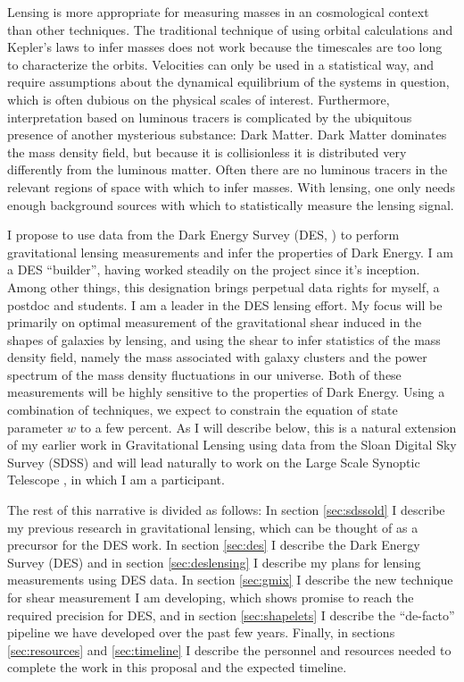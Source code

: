 \documentclass[12pt]{article}
\begin{document}
Lensing is more appropriate for measuring masses in an cosmological context
than other techniques.  The traditional technique of using orbital calculations
and Kepler's laws to infer masses does not work because the timescales are too
long to characterize the orbits. Velocities can only be used in a statistical
way, and require assumptions about the dynamical equilibrium of the systems in
question, which is often dubious on the physical scales of interest.
Furthermore, interpretation based on luminous tracers is complicated by the
ubiquitous presence of another mysterious substance: Dark Matter.  Dark Matter
dominates the mass density field, but because it is collisionless it is
distributed very differently from the luminous matter.  Often there are no
luminous tracers in the relevant regions of space with which to infer masses.
With lensing, one only needs enough background sources with which to
statistically measure the lensing signal.

I propose to use data from the Dark Energy Survey (DES, \cite{DESWhitePaper})
to perform gravitational lensing measurements and infer the properties of Dark
Energy.  I am a DES ``builder'', having worked steadily on the project since
it's inception.  Among other things, this designation brings perpetual data
rights for myself, a postdoc and students.  I am a leader in the DES lensing
effort.  My focus will be primarily on optimal measurement of the gravitational
shear induced in the shapes of galaxies by lensing, and using the shear to
infer statistics of the mass density field, namely the mass associated with
galaxy clusters and the power spectrum of the mass density fluctuations in our
universe. Both of these measurements will be highly sensitive to the properties
of Dark Energy.  Using a combination of techniques, we expect to constrain the
equation of state parameter $w$ to a few percent.  As I will describe below,
this is a natural extension of my earlier work in Gravitational Lensing using
data from the Sloan Digital Sky Survey (SDSS) and will lead naturally to work
on the Large Scale Synoptic Telescope \cite{lsstweb}, in which I am a
participant.

The rest of this narrative is divided as follows: In section \ref{sec:sdssold}
I describe my previous research in gravitational lensing, which can be thought
of as a precursor for the DES work.  In section \ref{sec:des} I describe the
Dark Energy Survey (DES) and in section \ref{sec:deslensing} I describe my
plans for lensing measurements using DES data.  In section \ref{sec:gmix} I
describe the new technique for shear measurement I am developing, which
shows promise to reach the required precision for DES, and in section
\ref{sec:shapelets} I describe the ``de-facto'' pipeline we have developed over
the past few years.  Finally, in sections \ref{sec:resources} and
\ref{sec:timeline} I describe the personnel and resources needed to complete the
work in this proposal and the expected timeline.
\end{document}
